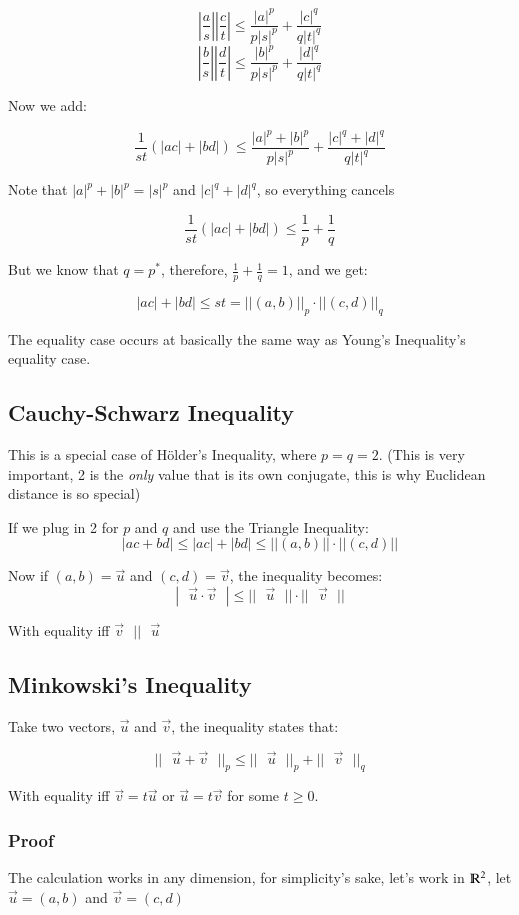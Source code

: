 \documentclass [12 pt, twoside] {book}
\newcommand\+{\text{ }}
\begin{document}
$$\left|\frac{a}{s}\right|\left|\frac{c}{t}\right| \leq \frac{|a|^p}{p|s|^p} + \frac{|c|^q}{q|t|^q}$$
$$\left|\frac{b}{s}\right|\left|\frac{d}{t}\right| \leq \frac{|b|^p}{p|s|^p} + \frac{|d|^q}{q|t|^q}$$

Now we add:

$$\frac{1}{st}(|ac| + |bd|) \leq \frac{|a|^p + |b|^p}{p|s|^p} + \frac{|c|^q +
|d|^q}{q|t|^q}$$

Note that $|a|^p + |b|^p = |s|^p$ and $|c|^q + |d|^q$, so everything cancels

$$\frac{1}{st}(|ac| + |bd|) \leq \frac{1}{p} + \frac{1}{q}$$

But we know that $q = p^*$, therefore, $\frac{1}{p} + \frac{1}{q} = 1$, and we
get:

$$|ac| + |bd| \leq st = ||(a, b)||_p \cdot ||(c, d)||_q$$

The equality case occurs at basically the same way as Young's Inequality's
equality case.

\subsection{Cauchy-Schwarz Inequality}
This is a special case of H\"{o}lder's Inequality, where $p = q = 2$. (This is
very important, 2 is the \textit{only} value that is its own conjugate, this is
why Euclidean distance is so special)

If we plug in 2 for $p$ and $q$ and use the Triangle Inequality:
$$|ac + bd| \leq |ac| + |bd| \leq ||(a, b)||\cdot||(c,d)||$$

Now if $(a, b) = \vec{u}$ and $(c, d) = \vec{v}$, the inequality becomes:
$$|\+\vec{u} \cdot \vec{v}\+| \leq ||\+\vec{u}\+||\cdot||\+\vec{v}\+||$$

With equality iff $\vec{v} \+||\+ \vec{u}$
\subsection{Minkowski's Inequality}
Take two vectors, $\vec{u}$ and $\vec{v}$, the inequality states that:

$$||\+\vec{u} + \vec{v}\+||_p \leq ||\+\vec{u}\+||_p + ||\+\vec{v}\+||_q$$

With equality iff $\vec{v} = t\vec{u}$ or $\vec{u} = t\vec{v}$ for some $t \geq
0$.

\subsubsection{Proof}
The calculation works in any dimension, for simplicity's sake, let's work in
$\varmathbb{R}^2$, let $\vec{u} = (a, b)$ and $\vec{v} = (c, d)$
\end{document}
